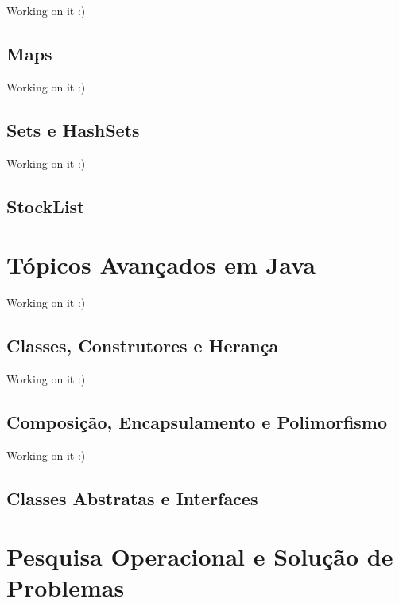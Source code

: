 \documentclass[
]{book}
\begin{document}
Working on it :)

\hypertarget{maps}{%
\section{Maps}\label{maps}}

Working on it :)

\hypertarget{sets-e-hashsets}{%
\section{Sets e HashSets}\label{sets-e-hashsets}}

Working on it :)

\hypertarget{stocklist}{%
\section{StockList}\label{stocklist}}

\hypertarget{tuxf3picos-avanuxe7ados-em-java}{%
\chapter{Tópicos Avançados em Java}\label{tuxf3picos-avanuxe7ados-em-java}}

Working on it :)

\hypertarget{classes-construtores-e-heranuxe7a}{%
\section{Classes, Construtores e Herança}\label{classes-construtores-e-heranuxe7a}}

Working on it :)

\hypertarget{composiuxe7uxe3o-encapsulamento-e-polimorfismo}{%
\section{Composição, Encapsulamento e Polimorfismo}\label{composiuxe7uxe3o-encapsulamento-e-polimorfismo}}

Working on it :)

\hypertarget{classes-abstratas-e-interfaces}{%
\section{Classes Abstratas e Interfaces}\label{classes-abstratas-e-interfaces}}

\hypertarget{pesquisa-operacional-e-soluuxe7uxe3o-de-problemas}{%
\chapter{Pesquisa Operacional e Solução de Problemas}\label{pesquisa-operacional-e-soluuxe7uxe3o-de-problemas}}
\end{document}
